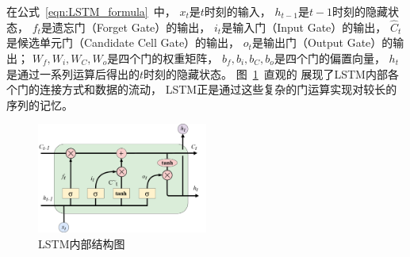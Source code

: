在公式~\ref{eqn:LSTM_formula}~中，
$x_t$是$t$时刻的输入，
$h_{t-1}$是$t-1$时刻的隐藏状态，
$f_t$是遗忘门（Forget Gate）的输出，
$i_t$是输入门（Input Gate）的输出，
$\hat{C}_t$是候选单元门（Candidate Cell Gate）的输出，
$o_t$是输出门（Output Gate）的输出；
$W_f, W_i, W_C, W_o$是四个门的权重矩阵，
$b_f, b_i, b_C, b_o$是四个门的偏置向量，
$h_t$是通过一系列运算后得出的$t$时刻的隐藏状态。
图~\ref{fig:LSTM_structure}~直观的
展现了LSTM内部各个门的连接方式和数据的流动，
LSTM正是通过这些复杂的门运算实现对较长的序列的记忆。
\begin{figure}[H]
    \includegraphics[width=0.5\textwidth]{figure/drawio/LSTM_v9.pdf}
    \centering
    \caption{LSTM内部结构图}
    \label{fig:LSTM_structure}
\end{figure}

